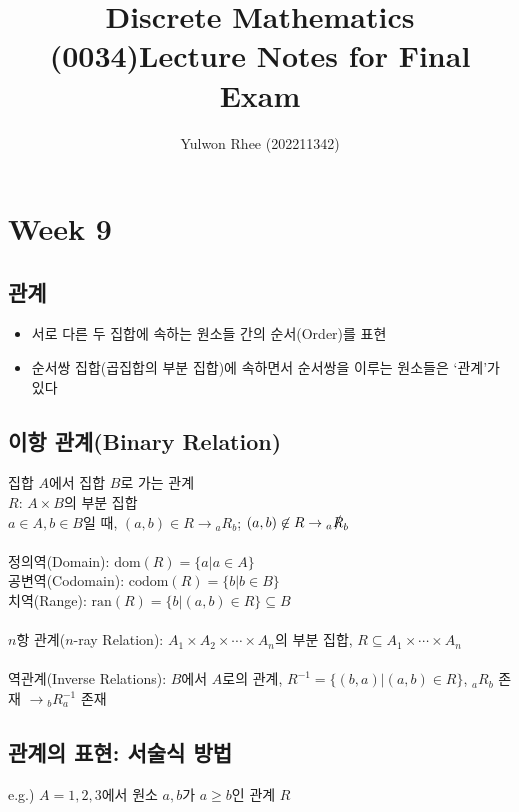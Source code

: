 



\title{Discrete Mathematics (0034)\newline\space Lecture Notes for Final Exam}
\author{Yulwon Rhee (202211342)}

\maketitle
\setcounter{section}{8}
\section{Week 9}
\subsection{관계}
\begin{itemize}
    \item 서로 다른 두 집합에 속하는 원소들 간의 순서(Order)를 표현
    \item 순서쌍 집합(곱집합의 부분 집합)에 속하면서 순서쌍을 이루는 원소들은 `관계'가 있다
\end{itemize}

\subsection{이항 관계(Binary Relation)}
집합 $A$에서 집합 $B$로 가는 관계\\
$R$: $A \times B$의 부분 집합\\
$a \in A, b \in B$일 때, $(a, b) \in R \to {_aR_b}$; $(a, b) \not\in R \to {_a\slashed{R}_b}$
\\\\
정의역(Domain): $\mathrm{dom}(R) = \{a | a \in A\}$\\
공변역(Codomain): $\mathrm{codom}(R) = \{b | b \in B\}$\\
치역(Range): $\mathrm{ran}(R) = \{b | (a, b) \in R\} \subseteq B$
\\\\
$n$항 관계($n$-ray Relation): $A_1 \times A_2 \times \cdots \times A_n$의 부분 집합, $R \subseteq A_1 \times \cdots \times A_n$
\\\\
역관계(Inverse Relations): $B$에서 $A$로의 관계, $R^{-1} = \{(b, a) | (a, b) \in R\}$, $_aR_b$ 존재 $\to {_bR^{-1}_a}$ 존재

\subsection{관계의 표현: 서술식 방법}
e.g.) $A={1, 2, 3}$에서 원소 $a, b$가 $a \geq b$인 관계 $R$

